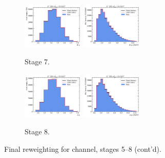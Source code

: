 \begin{figure}[htb]
    \begin{subfigure}{\textwidth}
        \centering
        \includegraphics[width=0.32\textwidth]{./figs-mc-correction/reweighting-final/plot_step7-Dst_iso-k_eta.pdf}
        \includegraphics[width=0.32\textwidth]{./figs-mc-correction/reweighting-final/plot_step7-Dst_iso-k_pt.pdf}
        \caption{Stage 7.}
    \end{subfigure}

    \begin{subfigure}{\textwidth}
        \centering
        \includegraphics[width=0.32\textwidth]{./figs-mc-correction/reweighting-final/plot_step8-Dst_iso-pi_eta.pdf}
        \includegraphics[width=0.32\textwidth]{./figs-mc-correction/reweighting-final/plot_step8-Dst_iso-pi_pt.pdf}
        \caption{Stage 8.}
    \end{subfigure}

    \caption[]{Final reweighting for \Dstar channel, stages 5--8 (cont'd).}
\end{figure}

